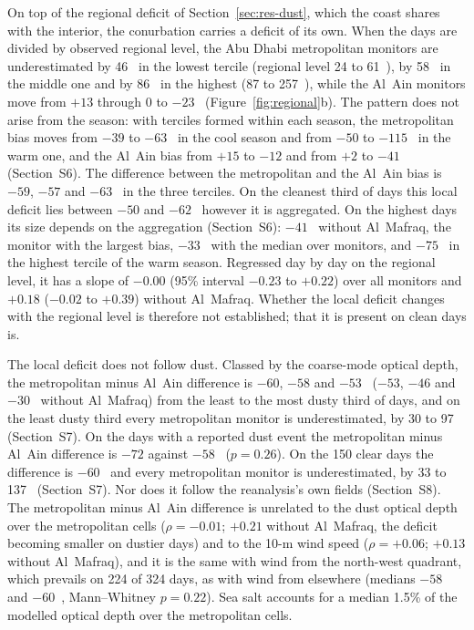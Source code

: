 On top of the regional deficit of Section~\ref{sec:res-dust}, which the coast shares with the
interior, the conurbation carries a deficit of its own. When the days are divided by observed
regional level, the Abu Dhabi metropolitan monitors are underestimated by 46~\ugm{} in the lowest
tercile (regional level 24 to 61~\ugm{}), by 58~\ugm{} in the middle one and by 86~\ugm{} in the
highest (87 to 257~\ugm{}), while the Al~Ain monitors move from $+13$ through 0 to $-23$~\ugm{}
(Figure~\ref{fig:regional}b). The pattern does not arise from the season: with terciles formed
within each season, the metropolitan bias moves from $-39$ to $-63$~\ugm{} in the cool season and
from $-50$ to $-115$~\ugm{} in the warm one, and the Al~Ain bias from $+15$ to $-12$ and from $+2$
to $-41$~\ugm{} (Section~S6). The difference between the metropolitan and the Al~Ain bias is
$-59$, $-57$ and $-63$~\ugm{} in the three terciles. On the cleanest third of days this local
deficit lies between $-50$ and $-62$~\ugm{} however it is aggregated. On the highest days its size
depends on the aggregation (Section~S6): $-41$~\ugm{} without Al~Mafraq, the monitor with the
largest bias, $-33$~\ugm{} with the median over monitors, and $-75$~\ugm{} in the highest tercile
of the warm season. Regressed day by day on the regional level, it has a slope of $-0.00$ (95\%
interval $-0.23$ to $+0.22$) over all monitors and $+0.18$ ($-0.02$ to $+0.39$) without
Al~Mafraq. Whether the local deficit changes with the regional level is therefore not
established; that it is present on clean days is.

The local deficit does not follow dust. Classed by the coarse-mode optical depth, the metropolitan
minus Al~Ain difference is $-60$, $-58$ and $-53$~\ugm{} ($-53$, $-46$ and $-30$~\ugm{} without
Al~Mafraq) from the least to the most dusty third of days, and on the least dusty third every
metropolitan monitor is underestimated, by 30 to 97~\ugm{} (Section~S7). On the days with a
reported dust event the metropolitan minus Al~Ain difference is $-72$ against $-58$~\ugm{}
($p=0.26$). On the 150 clear days the difference is $-60$~\ugm{} and every metropolitan monitor
is underestimated, by 33 to 137~\ugm{} (Section~S7). Nor does it follow the reanalysis's own
fields (Section~S8). The metropolitan minus Al~Ain difference is unrelated to the dust optical
depth over the metropolitan cells ($\rho=-0.01$; $+0.21$ without Al~Mafraq, the deficit becoming
smaller on dustier days) and to the 10-m wind speed ($\rho=+0.06$; $+0.13$ without Al~Mafraq), and
it is the same with wind from the north-west quadrant, which prevails on 224 of 324 days, as with
wind from elsewhere (medians $-58$ and $-60$~\ugm{}, Mann--Whitney $p=0.22$). Sea salt accounts
for a median 1.5\% of the modelled optical depth over the metropolitan cells.

